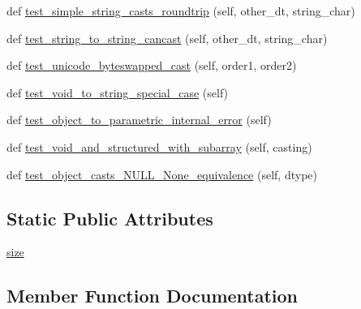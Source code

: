 \begin{DoxyCompactItemize}
\item 
def \hyperlink{classnumpy_1_1core_1_1tests_1_1test__casting__unittests_1_1TestCasting_a706dedf1672a9b781097f3e70ff967b0}{test\+\_\+simple\+\_\+string\+\_\+casts\+\_\+roundtrip} (self, other\+\_\+dt, string\+\_\+char)
\item 
def \hyperlink{classnumpy_1_1core_1_1tests_1_1test__casting__unittests_1_1TestCasting_ae679cc4d5d8bd6abb202f629bac18fa3}{test\+\_\+string\+\_\+to\+\_\+string\+\_\+cancast} (self, other\+\_\+dt, string\+\_\+char)
\item 
def \hyperlink{classnumpy_1_1core_1_1tests_1_1test__casting__unittests_1_1TestCasting_a7890bd1db107bd5416b4a8ac88eb22a5}{test\+\_\+unicode\+\_\+byteswapped\+\_\+cast} (self, order1, order2)
\item 
def \hyperlink{classnumpy_1_1core_1_1tests_1_1test__casting__unittests_1_1TestCasting_afb9e3b944ee3c8fec4cf7eef9905ea2c}{test\+\_\+void\+\_\+to\+\_\+string\+\_\+special\+\_\+case} (self)
\item 
def \hyperlink{classnumpy_1_1core_1_1tests_1_1test__casting__unittests_1_1TestCasting_a3882da502c94f147e21da1b0af276065}{test\+\_\+object\+\_\+to\+\_\+parametric\+\_\+internal\+\_\+error} (self)
\item 
def \hyperlink{classnumpy_1_1core_1_1tests_1_1test__casting__unittests_1_1TestCasting_af2398dc989909e1c1f9a6c7fb6977d1c}{test\+\_\+void\+\_\+and\+\_\+structured\+\_\+with\+\_\+subarray} (self, casting)
\item 
def \hyperlink{classnumpy_1_1core_1_1tests_1_1test__casting__unittests_1_1TestCasting_a54f7ea08a30da5861cdb6b5d10cad11d}{test\+\_\+object\+\_\+casts\+\_\+\+N\+U\+L\+L\+\_\+\+None\+\_\+equivalence} (self, dtype)
\end{DoxyCompactItemize}
\subsection*{Static Public Attributes}
\begin{DoxyCompactItemize}
\item 
\hyperlink{classnumpy_1_1core_1_1tests_1_1test__casting__unittests_1_1TestCasting_adced26039605445c098224b08e631993}{size}
\end{DoxyCompactItemize}


\subsection{Member Function Documentation}
\mbox{\label{classnumpy_1_1core_1_1tests_1_1test__casting__unittests_1_1TestCasting_abd21336e1b94a3e7bac6c3f1f88ee9fe}} 
